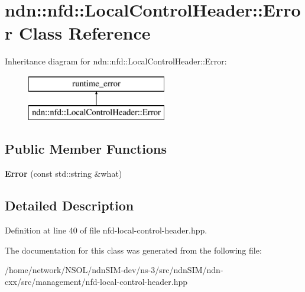 \hypertarget{classndn_1_1nfd_1_1LocalControlHeader_1_1Error}{}\section{ndn\+:\+:nfd\+:\+:Local\+Control\+Header\+:\+:Error Class Reference}
\label{classndn_1_1nfd_1_1LocalControlHeader_1_1Error}
Inheritance diagram for ndn\+:\+:nfd\+:\+:Local\+Control\+Header\+:\+:Error\+:\begin{figure}[H]
\begin{center}
\leavevmode
\includegraphics[height=2.000000cm]{classndn_1_1nfd_1_1LocalControlHeader_1_1Error}
\end{center}
\end{figure}
\subsection*{Public Member Functions}
\begin{DoxyCompactItemize}
\item 
{\bfseries Error} (const std\+::string \&what)\hypertarget{classndn_1_1nfd_1_1LocalControlHeader_1_1Error_a658722a56a07486de8234f2f29764d7e}{}\label{classndn_1_1nfd_1_1LocalControlHeader_1_1Error_a658722a56a07486de8234f2f29764d7e}

\end{DoxyCompactItemize}


\subsection{Detailed Description}


Definition at line 40 of file nfd-\/local-\/control-\/header.\+hpp.



The documentation for this class was generated from the following file\+:\begin{DoxyCompactItemize}
\item 
/home/network/\+N\+S\+O\+L/ndn\+S\+I\+M-\/dev/ns-\/3/src/ndn\+S\+I\+M/ndn-\/cxx/src/management/nfd-\/local-\/control-\/header.\+hpp\end{DoxyCompactItemize}
